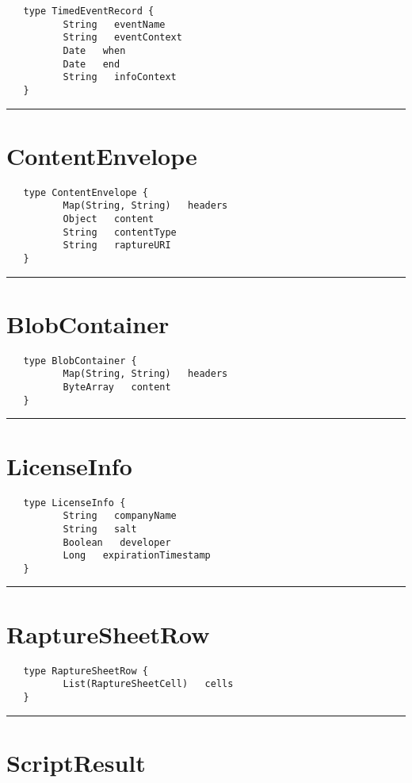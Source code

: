 \begin{Verbatim}
   type TimedEventRecord {
          String   eventName
          String   eventContext
          Date   when
          Date   end
          String   infoContext
   }
\end{Verbatim}

\rule{12cm}{2pt}
\section{ContentEnvelope}
\label{type:ContentEnvelope}

\begin{Verbatim}
   type ContentEnvelope {
          Map(String, String)   headers
          Object   content
          String   contentType
          String   raptureURI
   }
\end{Verbatim}

\rule{12cm}{2pt}
\section{BlobContainer}
\label{type:BlobContainer}

\begin{Verbatim}
   type BlobContainer {
          Map(String, String)   headers
          ByteArray   content
   }
\end{Verbatim}

\rule{12cm}{2pt}
\section{LicenseInfo}
\label{type:LicenseInfo}

\begin{Verbatim}
   type LicenseInfo {
          String   companyName
          String   salt
          Boolean   developer
          Long   expirationTimestamp
   }
\end{Verbatim}

\rule{12cm}{2pt}
\section{RaptureSheetRow}
\label{type:RaptureSheetRow}

\begin{Verbatim}
   type RaptureSheetRow {
          List(RaptureSheetCell)   cells
   }
\end{Verbatim}

\rule{12cm}{2pt}
\section{ScriptResult}
\label{type:ScriptResult}

